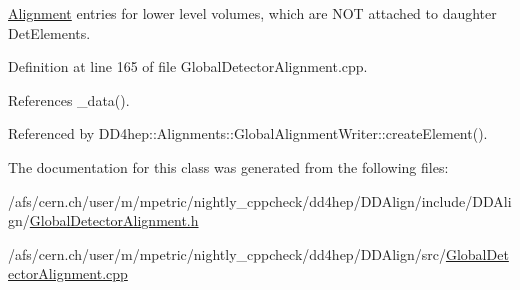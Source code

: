 \hyperlink{class_d_d4hep_1_1_alignments_1_1_alignment}{Alignment} entries for lower level volumes, which are NOT attached to daughter DetElements. 

Definition at line 165 of file GlobalDetectorAlignment.cpp.

References \_\-data().

Referenced by DD4hep::Alignments::GlobalAlignmentWriter::createElement().

The documentation for this class was generated from the following files:\begin{DoxyCompactItemize}
\item 
/afs/cern.ch/user/m/mpetric/nightly\_\-cppcheck/dd4hep/DDAlign/include/DDAlign/\hyperlink{_global_detector_alignment_8h}{GlobalDetectorAlignment.h}\item 
/afs/cern.ch/user/m/mpetric/nightly\_\-cppcheck/dd4hep/DDAlign/src/\hyperlink{_global_detector_alignment_8cpp}{GlobalDetectorAlignment.cpp}\end{DoxyCompactItemize}
